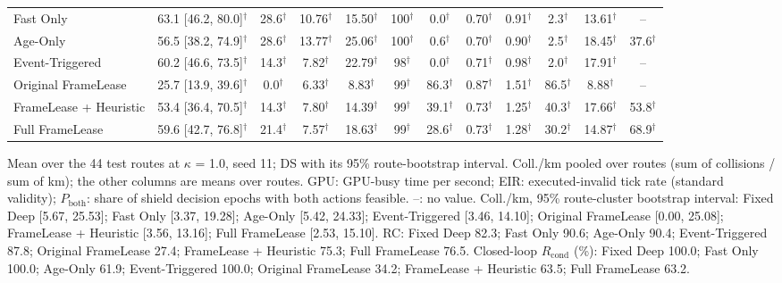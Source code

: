 \begin{table}[t]
\begin{tabular}{lccccccccccc}
Fast Only & 63.1 [46.2, 80.0]$^\dagger$ & 28.6$^\dagger$ & 10.76$^\dagger$ & 15.50$^\dagger$ & 100$^\dagger$ & 0.0$^\dagger$ & 0.70$^\dagger$ & 0.91$^\dagger$ & 2.3$^\dagger$ & 13.61$^\dagger$ & -- \\
Age-Only & 56.5 [38.2, 74.9]$^\dagger$ & 28.6$^\dagger$ & 13.77$^\dagger$ & 25.06$^\dagger$ & 100$^\dagger$ & 0.6$^\dagger$ & 0.70$^\dagger$ & 0.90$^\dagger$ & 2.5$^\dagger$ & 18.45$^\dagger$ & 37.6$^\dagger$ \\
Event-Triggered & 60.2 [46.6, 73.5]$^\dagger$ & 14.3$^\dagger$ & 7.82$^\dagger$ & 22.79$^\dagger$ & 98$^\dagger$ & 0.0$^\dagger$ & 0.71$^\dagger$ & 0.98$^\dagger$ & 2.0$^\dagger$ & 17.91$^\dagger$ & -- \\
Original FrameLease & 25.7 [13.9, 39.6]$^\dagger$ & 0.0$^\dagger$ & 6.33$^\dagger$ & 8.83$^\dagger$ & 99$^\dagger$ & 86.3$^\dagger$ & 0.87$^\dagger$ & 1.51$^\dagger$ & 86.5$^\dagger$ & 8.88$^\dagger$ & -- \\
FrameLease + Heuristic & 53.4 [36.4, 70.5]$^\dagger$ & 14.3$^\dagger$ & 7.80$^\dagger$ & 14.39$^\dagger$ & 99$^\dagger$ & 39.1$^\dagger$ & 0.73$^\dagger$ & 1.25$^\dagger$ & 40.3$^\dagger$ & 17.66$^\dagger$ & 53.8$^\dagger$ \\
\midrule
Full FrameLease & 59.6 [42.7, 76.8]$^\dagger$ & 21.4$^\dagger$ & 7.57$^\dagger$ & 18.63$^\dagger$ & 99$^\dagger$ & 28.6$^\dagger$ & 0.73$^\dagger$ & 1.28$^\dagger$ & 30.2$^\dagger$ & 14.87$^\dagger$ & 68.9$^\dagger$ \\
\bottomrule
\end{tabular}
\par\smallskip
\parbox{\textwidth}{\footnotesize
Mean over the 44 test routes at $\kappa$ = 1.0, seed 11; DS with its 95\% route-bootstrap interval. Coll./km pooled over routes (sum of collisions / sum of km); the other columns are means over routes. GPU: GPU-busy time per second; EIR: executed-invalid tick rate (standard validity); $P_\mathrm{both}$: share of shield decision epochs with both actions feasible. --: no value. 
Coll./km, 95\% route-cluster bootstrap interval: Fixed Deep [5.67, 25.53]; Fast Only [3.37, 19.28]; Age-Only [5.42, 24.33]; Event-Triggered [3.46, 14.10]; Original FrameLease [0.00, 25.08]; FrameLease + Heuristic [3.56, 13.16]; Full FrameLease [2.53, 15.10]. 
RC: Fixed Deep 82.3; Fast Only 90.6; Age-Only 90.4; Event-Triggered 87.8; Original FrameLease 27.4; FrameLease + Heuristic 75.3; Full FrameLease 76.5. 
Closed-loop $R_\mathrm{cond}$ (\%): Fixed Deep 100.0; Fast Only 100.0; Age-Only 61.9; Event-Triggered 100.0; Original FrameLease 34.2; FrameLease + Heuristic 63.5; Full FrameLease 63.2. 
}
\end{table}
